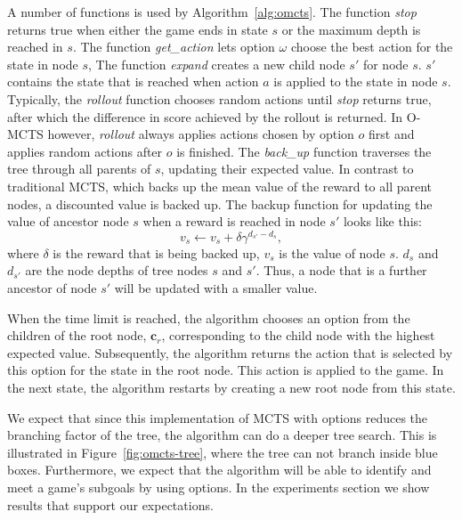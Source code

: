 A number of functions is used by Algorithm~\ref{alg:omcts}. The function
\emph{stop} returns true when either the game ends in state $s$ or the maximum
depth is reached in $s$. The function \emph{get\_action} lets option $\omega$
choose the best action for the state in node $s$, The function \emph{expand}
creates a new child node $s'$ for node $s$. $s'$ contains the state that is
reached when action $a$ is applied to the state in node $s$. Typically, the
\emph{rollout} function chooses random actions until \emph{stop} returns
true, after which the difference in score achieved by the rollout is returned.
In O-MCTS however, \emph{rollout} always applies actions chosen by option $o$
first and applies random actions after $o$ is finished. The \emph{back\_up}
function traverses the tree through all parents of $s$, updating their expected
value. In contrast to traditional MCTS, which backs up the mean value of the
reward to all parent nodes, a discounted value is backed up. The backup function
for updating the value of ancestor node $s$ when a reward is reached in node $s'$
looks like this:
\begin{equation}
	\label{eq:backup}
	v_s \gets v_s + \delta\gamma^{d_{s'}-d_{s}},
\end{equation}
where $\delta$ is the reward that is being backed up, $v_s$ is the value of node
$s$. $d_s$ and $d_{s'}$ are the node depths of tree nodes $s$ and $s'$. Thus, a
node that is a further ancestor of node $s'$ will be updated with a smaller
value.

When the time limit is reached, the algorithm chooses an option from the
children of the root node, $\mathbf{c}_r$, corresponding to the child node with the
highest expected value. Subsequently, the algorithm returns the action that is
selected by this option for the state in the root node. This action is applied
to the game. In the next state, the algorithm restarts by creating a new root
node from this state.

We expect that since this implementation of MCTS with options reduces the
branching factor of the tree, the
algorithm can do a deeper tree search. This is illustrated in
Figure~\ref{fig:omcts-tree}, where the tree can not branch inside blue boxes.
Furthermore, we expect that the algorithm will be able to identify and meet a
game's subgoals by using options. In the experiments section we show results
that support our expectations.
